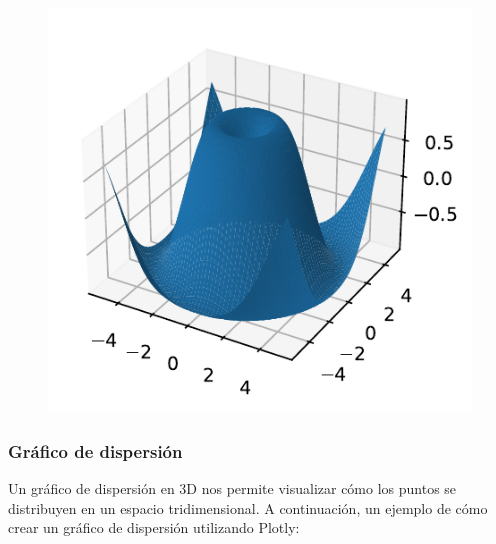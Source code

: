\documentclass[
  a4paper,
]{article}
\begin{document}
\begin{figure}[H]

{\centering \includegraphics{index_files/figure-pdf/cell-2-output-1.pdf}

}

\end{figure}

\hypertarget{gruxe1fico-de-dispersiuxf3n}{%
\subsubsection{Gráfico de
dispersión}\label{gruxe1fico-de-dispersiuxf3n}}

Un gráfico de dispersión en 3D nos permite visualizar cómo los puntos se
distribuyen en un espacio tridimensional. A continuación, un ejemplo de
cómo crear un gráfico de dispersión utilizando Plotly:
\end{document}

